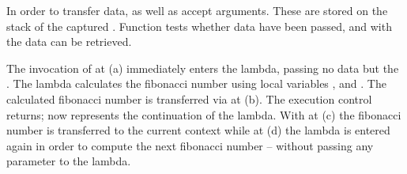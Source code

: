 In order to transfer data, \call as well as \op accept arguments. These are
stored on the stack of the captured \currcont. Function \davail tests whether data
have been passed, and with \dget the data can be retrieved.

The invocation of \call at (a) immediately enters the lambda, passing no data
but the \currcont. The lambda calculates the fibonacci number using local
variables ,  and . The calculated fibonacci number is
transferred via \op at (b). The execution control returns;  now
represents the continuation of the lambda. With \dget at (c) the fibonacci
number is transferred to the current context while at (d) the lambda is entered
again in order to compute the next fibonacci number -- without passing any
parameter to the lambda.
